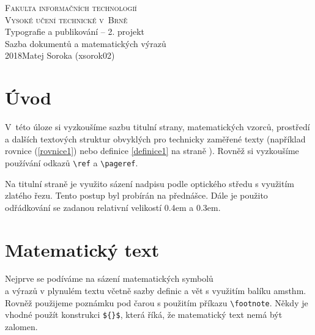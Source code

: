 \documentclass[a4paper,11pt,twocolumn]{article}
\theoremstyle{definition}
\theoremstyle{definition}
\theoremstyle{definition}
\begin{document}
\begin{titlepage}
\begin{center}
\Large
\textsc{\Huge Fakulta informačních technologií\\[3.75mm]
Vysoké učení technické v~Brně}\\
{\LARGE Typografie a publikování -- 2. projekt\\[1.5mm]
Sazba dokumentů a matematických výrazů}\\
\Large{2018}\hfill Matej Soroka (xsorok02)
\end{center}
\end{titlepage}

\section*{Úvod}
V~této úloze si vyzkoušíme sazbu titulní strany, matematických vzorců, prostředí a dalších textových struktur obvyklých pro technicky zaměřené texty (například rovnice (\ref{rovnice1}) nebo definice \ref{definice1} na straně \pageref{definice1}). Rovněž si vyzkoušíme používání
odkazů \verb|\ref| a \verb|\pageref|.

Na titulní straně je využito sázení nadpisu podle optického středu s využitím zlatého řezu. Tento postup byl probírán na přednášce. Dále je použito odřádkování se zadanou relativní velikostí 0.4em a 0.3em.

\section{Matematický text}
Nejprve se podíváme na sázení matematických symbolů\\ a výrazů v plynulém textu včetně sazby definic a vět s využitím balíku {\ttfamily amsthm}. Rovněž použijeme poznámku pod čarou s použitím příkazu \verb|\footnote|. Někdy je vhodné použít konstrukci \verb|${}$|, která říká, že matematický text nemá být zalomen.
\end{document}
